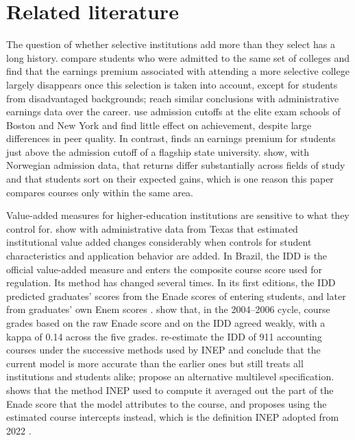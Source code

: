 \documentclass[11pt,a4paper]{article}
\begin{document}
\section{Related literature}\label{sec:literature}

The question of whether selective institutions add more than they select has a long history. \citet{dale2002} compare students who were admitted to the same set of colleges and find that the earnings premium associated with attending a more selective college largely disappears once this selection is taken into account, except for students from disadvantaged backgrounds; \citet{dale2014} reach similar conclusions with administrative earnings data over the career. \citet{abdulkadiroglu2014} use admission cutoffs at the elite exam schools of Boston and New York and find little effect on achievement, despite large differences in peer quality. In contrast, \citet{hoekstra2009} finds an earnings premium for students just above the admission cutoff of a flagship state university. \citet{kirkeboen2016} show, with Norwegian admission data, that returns differ substantially across fields of study and that students sort on their expected gains, which is one reason this paper compares courses only within the same area.

Value-added measures for higher-education institutions are sensitive to what they control for. \citet{cunha2014} show with administrative data from Texas that estimated institutional value added changes considerably when controls for student characteristics and application behavior are added. In Brazil, the IDD is the official value-added measure and enters the composite course score used for regulation. Its method has changed several times. In its first editions, the IDD predicted graduates' scores from the Enade scores of entering students, and later from graduates' own Enem scores \citep{bittencourt2008,garcia2014,inep2022idd}. \citet{bittencourt2008} show that, in the 2004--2006 cycle, course grades based on the raw Enade score and on the IDD agreed weakly, with a kappa of 0.14 across the five grades. \citet{fernandes2020} re-estimate the IDD of 911 accounting courses under the successive methods used by INEP and conclude that the current model is more accurate than the earlier ones but still treats all institutions and students alike; \citet{fernandes2021} propose an alternative multilevel specification. \citet{terhaar2021} shows that the method INEP used to compute it averaged out the part of the Enade score that the model attributes to the course, and proposes using the estimated course intercepts instead, which is the definition INEP adopted from 2022 \citep{inep2023idd}.
\end{document}
